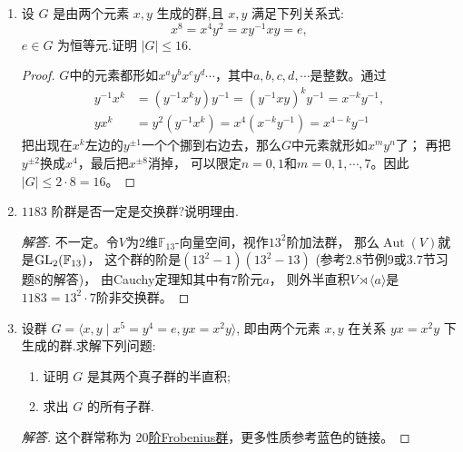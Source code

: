 \begin{enumerate}
\begin{proof}[解答]
\begin{enumerate}[label=(\arabic*)]
    反过来，外半直积亦可视为半直积，换句话说$N\rtimes_fH$有
    同构于$N$的正规子群$\underline{N}$和同构于$H$的子群$\underline{H}$，使得
    \[\underline{N}\cap\underline{H}=\{e\},
    \quad\underline{N}\underline{H}=N\rtimes_fH.\]
    事实上，令
    \[\underline{N}=\{(x,e) \mid x \in N\},
    \quad\underline{H}=\{(e,y) \mid y \in H\},\]
    通过
    \[(x_1,e)(x_2,e)=(x_1x_2,e),\quad(e,y_1)(e,y_2)=(e,y_1y_2)\]
    可知$\underline{N}$是同构于$N$的子群且$\underline{H}$是同构于$H$的子群。
    要说明$\underline{N}$正规，只需发现对于投影
    \[\pi:N\rtimes_fH \to H,\quad(n,h) \mapsto h\]
    有$\underline{N}=\ker\pi$。
    显然有$\underline{N}\cap\underline{H}=\{(e,e)\}$，最后
    \[(x,e)(e,y)=(x,y)\]
    说明$\underline{N}\underline{H}=N\rtimes_fH$。
    本质上这就把$f$变成了$\underline{H}$在$\underline{N}$上的共轭作用，这是因为
    \[(e,y)(x,e)(e,y)^{-1}=(f_y(x),y)(e,y^{-1})=(f_y(x),e).\qedhere\]
    \end{enumerate}
\end{proof}
\item 设 $G$ 是由两个元素 $x,y$ 生成的群,且 $x,y$ 满足下列关系式:
\[x^8 = x^4 y^2 = xy^{-1}xy = e,\]
$e \in G$ 为恒等元.证明 $|G| \leqslant 16$.
\begin{proof}
    $G$中的元素都形如$x^ay^bx^cy^d\cdots$，其中$a,b,c,d,\cdots$是整数。通过
    \begin{align*}
        y^{-1}x^k&=(y^{-1}x^ky)y^{-1}=(y^{-1}xy)^ky^{-1}=x^{-k}y^{-1},\\
        yx^k&=y^2(y^{-1}x^k)=x^4(x^{-k}y^{-1})=x^{4-k}y^{-1}
    \end{align*}
    把出现在$x^k$左边的$y^{\pm1}$一个个挪到右边去，那么$G$中元素就形如$x^my^n$了；
    再把$y^{\pm2}$换成$x^4$，最后把$x^{\pm8}$消掉，
    可以限定$n=0,1$和$m=0,1,\cdots,7$。因此$|G|\leqslant2\cdot8=16$。
\end{proof}
\item $1183$ 阶群是否一定是交换群?说明理由.
\begin{proof}[解答]
    不一定。令$V$为$2$维$\mathbb{F}_{13}$-向量空间，视作$13^2$阶加法群，
    那么$\operatorname{Aut}(V)$就是${\rm GL}_2(\mathbb{F}_{13})$，
    这个群的阶是$(13^2-1)(13^2-13)$ (参考2.8节例9或3.7节习题8的解答)，
    由Cauchy定理知其中有$7$阶元$a$，
    则外半直积$V\rtimes\langle a \rangle$是$1183=13^2\cdot7$阶非交换群。
\end{proof}
\item 设群 $G = \langle x,y \mid x^5 = y^4 = e , yx = x^2 y \rangle$,
即由两个元素 $x,y$ 在关系 $yx = x^2 y$ 下生成的群.求解下列问题:
\begin{enumerate}[label=(\arabic*)]
\item 证明 $G$ 是其两个真子群的半直积;
\item 求出 $G$ 的所有子群.
\end{enumerate}
\begin{proof}[解答]
    这个群常称为 \href{https://groupprops.subwiki.org/wiki/General_affine_group:GA(1,5)}{$20$阶Frobenius群}，更多性质参考蓝色的链接。


\end{proof}
\end{enumerate}
